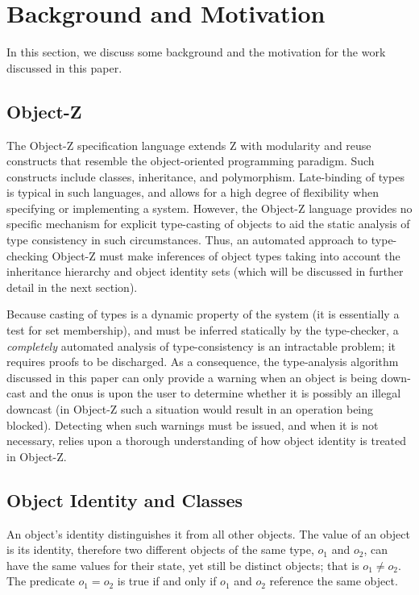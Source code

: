 \section{Background and Motivation}
\label{background}

In this section, we discuss some background and the motivation for the
work discussed in this paper.

\subsection{Object-Z}

The Object-Z specification language extends Z with modularity and reuse
constructs that resemble the object-oriented programming paradigm. Such
constructs include classes, inheritance, and polymorphism. Late-binding
of types is typical in such languages, and allows for a high degree of
flexibility when specifying or implementing a system. However, the
Object-Z language provides no specific mechanism for explicit
type-casting of objects to aid the static analysis of type consistency
in such circumstances. Thus, an automated approach to type-checking
Object-Z must make inferences of object types taking into account the
inheritance hierarchy and object identity sets (which will be discussed
in further detail in the next section). 

Because casting of types is a dynamic property of the system (it is
essentially a test for set membership), and must be inferred
statically by the type-checker, a {\em completely} automated analysis
of type-consistency is an intractable problem; it requires proofs to
be discharged. As a consequence, the type-analysis algorithm discussed
in this paper can only provide a warning when an object is being
down-cast and the onus is upon the user to determine whether it is
possibly an illegal downcast (in Object-Z such a situation would
result in an operation being blocked). Detecting when such warnings
must be issued, and when it is not necessary, relies upon a thorough
understanding of how object identity is treated in Object-Z.

\subsection{Object Identity and Classes}

An object's identity distinguishes it from all other objects. The
value of an object is its identity, therefore two
different objects of the same type, $o_{1}$ and $o_{2}$, can have the
same values for their state, yet still be distinct objects; that is
$o_{1} \neq o_{2}$. The predicate $o_{1} = o_{2}$ is true if and only
if $o_{1}$ and $o_{2}$ reference the same object.

